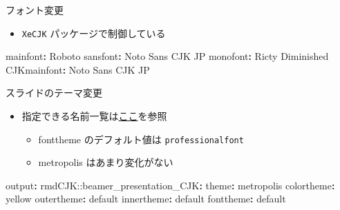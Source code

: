 \documentclass[
  12pt,
  ignorenonframetext,
]{beamer}
\newenvironment{Shaded}{\begin{snugshade}}{\end{snugshade}}
\newcommand{\AttributeTok}[1]{\textcolor[rgb]{0.77,0.63,0.00}{#1}}
\newcommand{\FunctionTok}[1]{\textcolor[rgb]{0.00,0.00,0.00}{#1}}
\newcommand{\KeywordTok}[1]{\textcolor[rgb]{0.13,0.29,0.53}{\textbf{#1}}}
\providecommand{\tightlist}{%
  \setlength{\itemsep}{0pt}\setlength{\parskip}{0pt}}
\begin{document}
\begin{frame}[fragile]{フォント変更}
\protect\hypertarget{ux30d5ux30a9ux30f3ux30c8ux5909ux66f4}{}

\begin{itemize}
\tightlist
\item
  \texttt{XeCJK} パッケージで制御している
\end{itemize}

\begin{Shaded}
\begin{Highlighting}[]
\FunctionTok{mainfont}\KeywordTok{:}\AttributeTok{ Roboto}
\FunctionTok{sansfont}\KeywordTok{:}\AttributeTok{ Noto Sans CJK JP}
\FunctionTok{monofont}\KeywordTok{:}\AttributeTok{ Ricty Diminished}
\FunctionTok{CJKmainfont}\KeywordTok{:}\AttributeTok{ Noto Sans CJK JP}
\end{Highlighting}
\end{Shaded}

\end{frame}

\begin{frame}[fragile]{スライドのテーマ変更}
\protect\hypertarget{ux30b9ux30e9ux30a4ux30c9ux306eux30c6ux30fcux30deux5909ux66f4}{}

\begin{itemize}
\tightlist
\item
  指定できる名前一覧は\href{https://deic-web.uab.cat/~iblanes/beamer_gallery/index.html}{ここ}を参照

  \begin{itemize}
  \tightlist
  \item
    fonttheme のデフォルト値は \texttt{professionalfont}
  \item
    metropolis はあまり変化がない
  \end{itemize}
\end{itemize}

\begin{Shaded}
\begin{Highlighting}[]
\FunctionTok{output}\KeywordTok{:}
\AttributeTok{  rmdCJK:}\FunctionTok{:beamer_presentation_CJK}\KeywordTok{:}
\AttributeTok{    }\FunctionTok{theme}\KeywordTok{:}\AttributeTok{ metropolis}
\AttributeTok{    }\FunctionTok{colortheme}\KeywordTok{:}\AttributeTok{ yellow}
\AttributeTok{    }\FunctionTok{outertheme}\KeywordTok{:}\AttributeTok{ default}
\AttributeTok{    }\FunctionTok{innertheme}\KeywordTok{:}\AttributeTok{ default}
\AttributeTok{    }\FunctionTok{fonttheme}\KeywordTok{:}\AttributeTok{ default}
\end{Highlighting}
\end{Shaded}

\end{frame}
\end{document}
